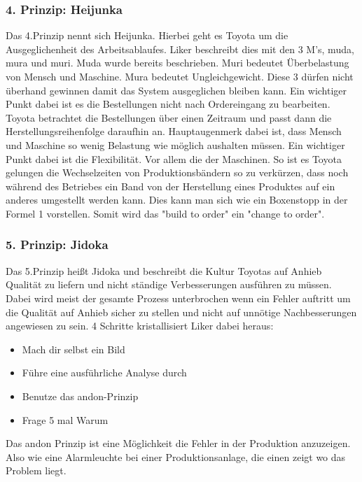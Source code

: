 \documentclass[a4paper,12pt]{scrartcl}
\begin{document}
\subsubsection{4. Prinzip: Heijunka}

Das 4.Prinzip nennt sich Heijunka. Hierbei geht es Toyota um die Ausgeglichenheit des Arbeitsablaufes. Liker beschreibt dies mit den 3 M's, muda, mura und muri. Muda wurde bereits beschrieben. Muri bedeutet Überbelastung von Mensch und Maschine. Mura bedeutet Ungleichgewicht. Diese 3 dürfen nicht überhand gewinnen damit das System ausgeglichen bleiben kann. Ein wichtiger Punkt dabei ist es die Bestellungen nicht nach Ordereingang zu bearbeiten. Toyota betrachtet die Bestellungen über einen Zeitraum und passt dann die Herstellungsreihenfolge daraufhin an. Hauptaugenmerk dabei ist, dass Mensch und Maschine so wenig Belastung wie möglich aushalten müssen. Ein wichtiger Punkt dabei ist die Flexibilität. Vor allem die der Maschinen. So ist es Toyota gelungen die Wechselzeiten von Produktionsbändern so zu verkürzen, dass noch während des Betriebes ein Band von der Herstellung eines Produktes auf ein anderes umgestellt werden kann. Dies kann man sich wie ein Boxenstopp in der Formel 1 vorstellen. Somit wird das "build to order" ein "change to order".

\subsubsection{5. Prinzip: Jidoka}

Das 5.Prinzip heißt Jidoka und beschreibt die Kultur Toyotas auf Anhieb Qualität zu liefern und nicht ständige Verbesserungen ausführen zu müssen. Dabei wird meist der gesamte Prozess unterbrochen wenn ein Fehler auftritt um die Qualität auf Anhieb sicher zu stellen und nicht auf unnötige Nachbesserungen angewiesen zu sein. 4 Schritte kristallisiert Liker dabei heraus:

\begin{itemize}
    \item Mach dir selbst ein Bild
    \item Führe eine ausführliche Analyse durch
    \item Benutze das andon-Prinzip 
    \item Frage 5 mal Warum
\end{itemize}

Das andon Prinzip ist eine Möglichkeit die Fehler in der Produktion anzuzeigen. Also wie eine Alarmleuchte bei einer Produktionsanlage, die einen zeigt wo das Problem liegt.
\end{document}
